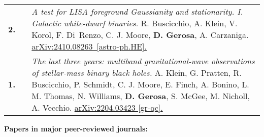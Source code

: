 {\begin{longtable}{rp{0.3cm}p{15.8cm}}
%
\textbf{2.} & & \textit{A test for LISA foreground Gaussianity and stationarity. I. Galactic white-dwarf binaries.}
\newline{}
R. Buscicchio, A. Klein, V. Korol, F. Di Renzo, C. J. Moore, \textbf{D. Gerosa}, A. Carzaniga.
\newline{}
\href{https://arxiv.org/abs/2410.08263}{arXiv:2410.08263 [astro-ph.HE].}
\vspace{0.09cm}\\
%
\textbf{1.} & & \textit{The last three years: multiband gravitational-wave observations of stellar-mass binary black holes.}
\newline{}
A. Klein, G. Pratten, R. Buscicchio, P. Schmidt, C. J. Moore, E. Finch, A. Bonino, L. M. Thomas, N. Williams, \textbf{D. Gerosa}, S. McGee, M. Nicholl, A. Vecchio.
\newline{}
\href{https://arxiv.org/abs/2204.03423}{arXiv:2204.03423 [gr-qc].}
\vspace{0.09cm}\\
%
\end{longtable} }
\textcolor{color1}{\textbf{Papers in major peer-reviewed journals:}}
\vspace{-0.5cm}

